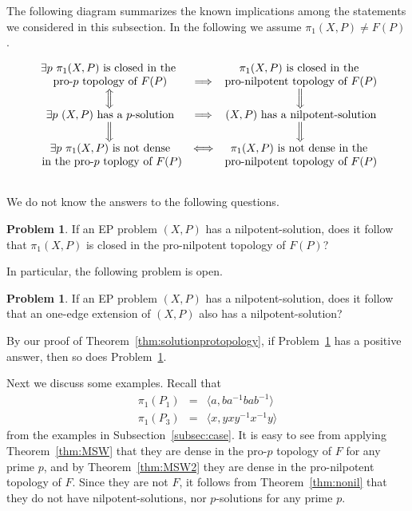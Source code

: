 \documentclass[10pt,a4paper]{amsart}
\theoremstyle{definition}
\newtheorem{problem}[theorem]{Problem}
\theoremstyle{definition}
\numberwithin{equation}{section}
\begin{document}
The following diagram summarizes the known implications among the statements we considered in this subsection. In the following we assume $\pi_1(X, P)\neq F(P)$.

$$
\begin{array}{ccc}
\mbox{$\exists p$ $\pi_1(X, P)$ is closed in the } & &  \mbox{$\pi_1(X, P)$ is closed in the } \\
\mbox{pro-$p$ topology of $F(P)$} & \Longrightarrow & \mbox{pro-nilpotent topology of $F(P)$} \\
\displaystyle\left\Updownarrow\vphantom{\sum}\right. & & \displaystyle\left\Downarrow\vphantom{\sum}\right. \\
\mbox{$\exists p$ $(X, P)$ has a $p$-solution} & \Longrightarrow & \mbox{$(X, P)$ has a nilpotent-solution} \\
\displaystyle\left\Downarrow\vphantom{\sum}\right. & & \displaystyle\left\Downarrow\vphantom{\sum}\right. \\
\mbox{$\exists p$ $\pi_1(X, P)$ is not dense} & \Longleftrightarrow & \mbox{$\pi_1(X, P)$ is not dense in the } \\
\mbox{ in the pro-$p$ toplogy of $F(P)$} & & \mbox{pro-nilpotent topology of $F(P)$} \\ \\
\end{array}
$$

We do not know the answers to the following questions.

\begin{problem}\label{prob:nil} If an EP problem $(X, P)$ has a nilpotent-solution, does it follow that $\pi_1(X, P)$ is closed in the pro-nilpotent topology of $F(P)$?
\end{problem}

In particular, the following problem is open.

\begin{problem}\label{prob:ope} If an EP problem $(X, P)$ has a nilpotent-solution, does it follow that an one-edge extension of $(X, P)$ also has a nilpotent-solution?
\end{problem}

By our proof of Theorem~\ref{thm:solutionprotopology}, if Problem~\ref{prob:ope} has a positive answer, then so does Problem~\ref{prob:nil}.

Next we discuss some examples. Recall that
$$ \begin{array}{rcl}
\pi_1(P_1)\!\!\!&=&\!\!\! \langle a, ba^{-1}bab^{-1}\rangle \\
\pi_1(P_3)\!\!\!&=&\!\!\! \langle x, yxy^{-1}x^{-1}y\rangle  
\end{array}
$$
from the examples in Subsection~\ref{subsec:case}. It is easy to see from applying Theorem~\ref{thm:MSW} that they are dense in the pro-$p$ topology of $F$ for any prime $p$, and by Theorem~\ref{thm:MSW2} they are dense in the pro-nilpotent topology of $F$. Since they are not $F$, it follows from Theorem~\ref{thm:nonil} that they do not have nilpotent-solutions, nor $p$-solutions for any prime $p$. 
\end{document}

